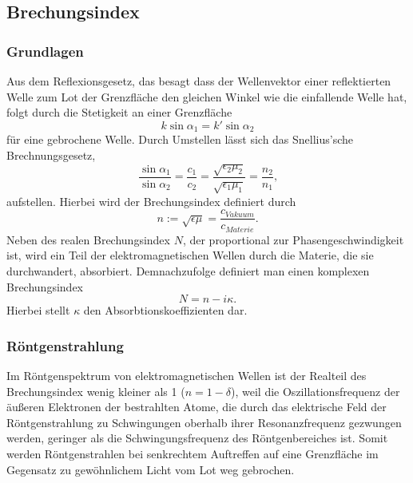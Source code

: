 \subsection{Brechungsindex}
\subsubsection*{Grundlagen}
Aus dem Reflexionsgesetz, das besagt dass der Wellenvektor einer reflektierten Welle zum Lot der Grenzfläche den gleichen Winkel wie die einfallende Welle hat,
folgt durch die Stetigkeit an einer Grenzfläche
\begin{equation}
    k \sin \alpha_1 = k' \sin \alpha_2
    \label{eq:Stetigkeit}
\end{equation}
für eine gebrochene Welle.
Durch Umstellen lässt sich das Snellius'sche Brechnungsgesetz,
\begin{equation}
    \frac{\sin \alpha_1}{\sin \alpha_2} = \frac{c_1}{c_2} = \frac{\sqrt{\epsilon_2\mu_2}}{\sqrt{\epsilon_1\mu_1}} = \frac{n_2}{n_1} \text{,}
    \label{eq:Snellius}
\end{equation}
aufstellen. Hierbei wird der Brechungsindex definiert durch
\begin{equation}
    n := \sqrt{\epsilon\mu} = \frac{c_{Vakuum}}{c_{Materie}}.
\end{equation}
Neben des realen Brechungsindex $N$, der proportional zur Phasengeschwindigkeit ist,
wird ein Teil der elektromagnetischen Wellen durch die Materie, die sie durchwandert, absorbiert.
Demnachzufolge definiert man einen komplexen Brechungsindex
\begin{equation}
    N = n - i\kappa \text{.}
    \label{eq:nKomplex}
\end{equation}
Hierbei stellt $\kappa$ den Absorbtionskoeffizienten dar.

\subsubsection*{Röntgenstrahlung}
Im Röntgenspektrum von elektromagnetischen Wellen ist der Realteil des Brechungsindex wenig kleiner als 1 ($n = 1 - \delta$),
weil die Oszillationsfrequenz der äußeren Elektronen der bestrahlten Atome, die durch das elektrische Feld der Röntgenstrahlung zu Schwingungen oberhalb
ihrer Resonanzfrequenz gezwungen werden, geringer als die Schwingungsfrequenz des Röntgenbereiches ist.
Somit werden Röntgenstrahlen bei senkrechtem Auftreffen auf eine Grenzfläche im Gegensatz zu gewöhnlichem Licht vom Lot weg gebrochen.

